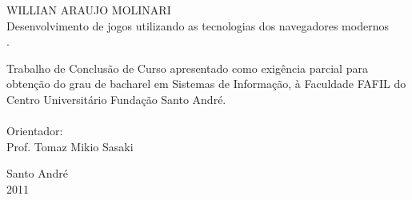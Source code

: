 \thispagestyle{empty}

\vspace{3cm}
\begin{center}
WILLIAN ARAUJO MOLINARI \\
\vspace{3cm}
\huge Desenvolvimento de jogos utilizando as tecnologias dos navegadores modernos \\
\vspace{2.5cm}
\large.\\
\hspace{7cm} \begin{minipage}{0.5\textwidth}
Trabalho de Conclusão de Curso apresentado como exigência parcial para
obtenção do grau de bacharel em Sistemas de Informação, à Faculdade
FAFIL do Centro Universitário Fundação Santo André. \\
\\
Orientador: \\
Prof. Tomaz Mikio Sasaki
\end{minipage}
\vspace{6cm}

\large Santo André \\ 2011
\end{center}
